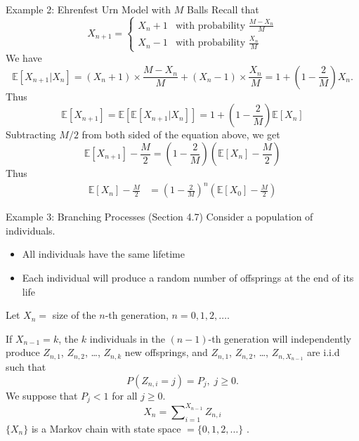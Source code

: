 \documentclass[letterpaper,handout, mathserif]{beamer}
\def\Sum{\sum\nolimits}
\def\E{\mathbb E}
\begin{document}
\begin{frame}{Example 2: Ehrenfest Urn Model with $M$ Balls}
Recall that
$$
X_{n+1}=
\begin{cases}
X_n+1 & \mbox{with probability } \frac{M-X_n}{M}\\
X_n-1 & \mbox{with probability } \frac{X_n}{M}
\end{cases}
$$
We have
$$
\E[X_{n+1}|X_n]=(X_n+1)\times \frac{M-X_n}{M}+(X_n-1)\times\frac{X_n}{M}=1+\left(1-\frac{2}{M}\right)X_n.
$$
Thus
$$
\E[X_{n+1}]=\E[\E[X_{n+1}|X_n]]=1+\left(1-\frac{2}{M}\right)\E[X_n]
$$
Subtracting $M/2$ from both sided of the equation above, we get
$$
\E[X_{n+1}]-\frac{M}{2}=\left(1-\frac{2}{M}\right)(\E[X_n]-\frac{M}{2})
$$
Thus
\begin{align*}
\E[X_n]-\frac{M}{2}
&=\left(1-\frac{2}{M}\right)^n(\E[X_{0}]-\frac{M}{2})
\end{align*}
\end{frame}
\begin{frame}{Example 3: Branching Processes (Section 4.7)}
Consider a population of individuals.
\begin{itemize}
\item All individuals have the same lifetime
\item Each individual will produce a random number of offsprings at the end of its life
\end{itemize}
Let $X_n=$ size of the $n$-th generation, $n=0,1,2,\ldots$.

If $X_{n-1}=k$, the $k$ individuals in the $(n-1)$-th generation will independently produce $Z_{n,1}$, $Z_{n,2}$, \ldots, $Z_{n,k}$ new offsprings, and $Z_{n,1}$, $Z_{n,2}$, \ldots, $Z_{n,X_{n-1}}$ are i.i.d such that
$$P(Z_{n,i}=j)=P_j,\; j \ge 0.$$
We suppose that $P_j < 1$ for all $j \ge 0$.
\begin{equation}\label{eq:branching}
X_{n} =\Sum_{i=1}^{X_{n-1}}Z_{n,i}
\end{equation}
$\{X_n\}$ is a Markov chain with state space $=\{0,1,2,\ldots\}$ .
\end{frame}
\end{document}
